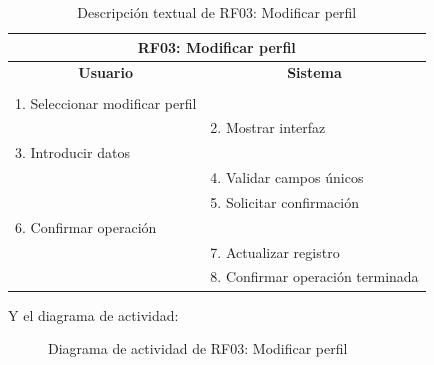 \begin{itemize}
	\begin{table}[h]
		\centering	
		\begin{tabular}{|l|l|}
			\hline
			\multicolumn{2}{|c|}{\textbf{RF03: Modificar perfil}} \\ \hline
			\multicolumn{1}{|c|}{\textbf{Usuario}} & \multicolumn{1}{c|}{\textbf{Sistema}} \\ \hline
			[Pto. inclusión: RF02: Loguear usuario] &\\ \hline
			1. Seleccionar modificar perfil &\\ \hline
			& 2. Mostrar interfaz\\ \hline
			3. Introducir datos &\\ \hline
			& 4. Validar campos únicos\\ \hline
			& 5. Solicitar confirmación\\ \hline
			6. Confirmar operación &\\ \hline
			& 7. Actualizar registro \\ \hline
			& 8. Confirmar operación terminada \\ \hline 
		\end{tabular}
		\caption{Descripción textual de RF03: Modificar perfil}
		\label{tab:tablaDescTextualRF03}
	\end{table}
	
	Y el diagrama de actividad:
	
	\begin{figure}[!htb]
		\centering
		\caption{Diagrama de actividad de RF03: Modificar perfil}
		\label{fig:diagramaActividad_RF03}
	\end{figure}
	

\end{itemize}
